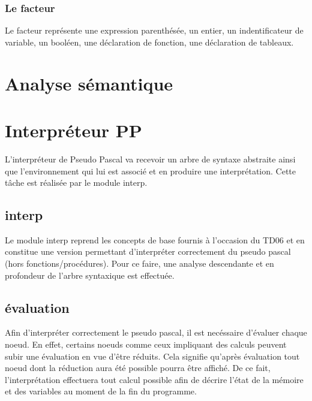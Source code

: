 \documentclass[11pt,a4paper]{article}
\begin{document}
\subsubsection{Le facteur}
Le facteur représente une expression parenthésée, un entier, un indentificateur de variable, un booléen, une déclaration de fonction, une déclaration de tableaux.


\section{Analyse sémantique}



\section{Interpréteur PP}
L'interpréteur de Pseudo Pascal va recevoir un arbre de syntaxe abstraite ainsi que l'environnement qui lui est associé et en produire une interprétation.
Cette tâche est réalisée par le module interp.
\subsection{interp}
Le module interp reprend les concepts de base fournis à l'occasion du TD06 et en constitue une version permettant d'interpréter correctement du pseudo pascal (hors fonctions/procédures).
Pour ce faire, une analyse descendante et en profondeur de l'arbre syntaxique est effectuée.
\subsection{évaluation}
Afin d'interpréter correctement le pseudo pascal, il est necéssaire d'évaluer chaque noeud.
En effet, certains noeuds comme ceux impliquant des calculs peuvent subir une évaluation en vue d'être réduits.
Cela signifie qu'après évaluation tout noeud dont la réduction aura été possible pourra être affiché.
De ce fait, l'interprétation effectuera tout calcul possible afin de décrire l'état de la mémoire et des variables au moment de la fin du programme.
\end{document}
